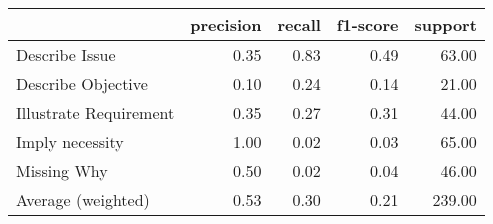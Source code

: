 \begin{tabular}{lrrrr}
\toprule
 & precision & recall & f1-score & support \\
\midrule
Describe Issue & 0.35 & 0.83 & 0.49 & 63.00 \\
Describe Objective & 0.10 & 0.24 & 0.14 & 21.00 \\
Illustrate Requirement & 0.35 & 0.27 & 0.31 & 44.00 \\
Imply necessity & 1.00 & 0.02 & 0.03 & 65.00 \\
Missing Why & 0.50 & 0.02 & 0.04 & 46.00 \\
Average (weighted) & 0.53 & 0.30 & 0.21 & 239.00 \\
\bottomrule
\end{tabular}
